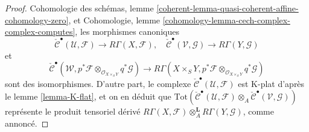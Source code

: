 \begin{proof}
Cohomologie des schémas, lemme
\ref{coherent-lemma-quasi-coherent-affine-cohomology-zero},
et
Cohomologie, lemme \ref{cohomology-lemma-cech-complex-complex-computes},
les morphismes canoniques
$$
\check{\mathcal{C}}^\bullet(\mathcal{U}, \mathcal{F})
\to
R\Gamma(X, \mathcal{F}),
\quad
\check{\mathcal{C}}^\bullet(\mathcal{V}, \mathcal{G})
\to
R\Gamma(Y, \mathcal{G})
$$
et
$$
\check{\mathcal{C}}^\bullet(\mathcal{W},
p^*\mathcal{F} \otimes_{\mathcal{O}_{X \times_S Y}} q^*\mathcal{G})
\to
R\Gamma(X \times_S Y,
p^*\mathcal{F} \otimes_{\mathcal{O}_{X \times_S Y}}
q^*\mathcal{G})
$$
sont des isomorphismes. D'autre part, le complexe
$\check{\mathcal{C}}^\bullet(\mathcal{U}, \mathcal{F})$
est K-plat d'après le lemme \ref{lemma-K-flat}, et on en déduit que
$\text{Tot}(
\check{\mathcal{C}}^\bullet(\mathcal{U}, \mathcal{F})
\otimes_A
\check{\mathcal{C}}^\bullet(\mathcal{V}, \mathcal{G}))$
représente le produit tensoriel dérivé
$R\Gamma(X, \mathcal{F}) \otimes_A^\mathbf{L} R\Gamma(Y, \mathcal{G})$,
comme annoncé.


\end{proof}
